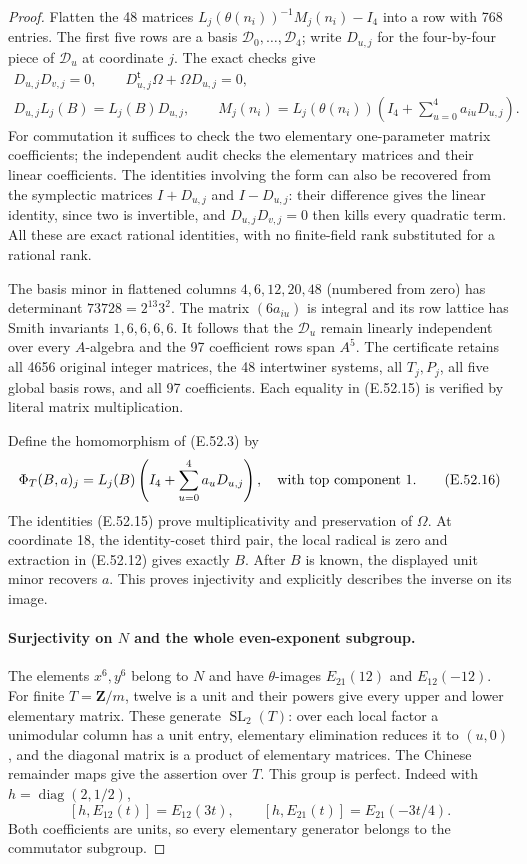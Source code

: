 \begin{proof}
Flatten the 48 matrices
$L_j(\theta(n_i))^{-1}M_j(n_i)-I_4$ into a row
with 768 entries. The first five rows are a basis
$\mathcal D_0,\ldots,\mathcal D_4$; write
$D_{u,j}$ for the four-by-four piece of $\mathcal D_u$
at coordinate $j$. The exact checks give
\[
 \begin{gathered}
 D_{u,j}D_{v,j}=0,
 \qquad D_{u,j}^{\mathsf t}\Omega+\Omega D_{u,j}=0,\\
 D_{u,j}L_j(B)=L_j(B)D_{u,j},\qquad
 M_j(n_i)=L_j(\theta(n_i))
                    \left(I_4+\sum_{u=0}^4a_{iu}D_{u,j}\right).
 \end{gathered}
 \tag{E.52.15}
\]
For commutation it suffices to check the two elementary
one-parameter matrix coefficients; the independent audit
checks the elementary matrices and their linear
coefficients. The identities involving the form can
also be recovered from the symplectic matrices
$I+D_{u,j}$ and $I-D_{u,j}$: their difference gives
the linear identity, since two is invertible, and
$D_{u,j}D_{v,j}=0$ then kills every quadratic term.
All these are exact rational identities, with no
finite-field rank substituted for a rational rank.

The basis minor in flattened columns
$4,6,12,20,48$ (numbered from zero) has determinant
$73728=2^{13}3^2$.
The matrix $(6a_{iu})$ is integral and its row lattice
has Smith invariants $1,6,6,6,6$.
It follows that the $\mathcal D_u$ remain linearly
independent over every $A$-algebra and the 97
coefficient rows span $A^5$.
The certificate retains all 4656 original integer
matrices, the 48 intertwiner systems, all $T_j,P_j$,
all five global basis rows, and all 97 coefficients.
Each equality in \textup{(E.52.15)} is verified by
literal matrix multiplication.

Define the homomorphism of \textup{(E.52.3)} by
\[
 \Phi_T(B,a)_j
       =L_j(B)\left(I_4+\sum_{u=0}^4a_uD_{u,j}\right),
                  \quad\hbox{with top component }1.
 \tag{E.52.16}
\]
The identities \textup{(E.52.15)} prove multiplicativity
and preservation of $\Omega$.
At coordinate 18, the identity-coset third pair, the
local radical is zero and extraction in
\textup{(E.52.12)} gives exactly $B$.
After $B$ is known, the displayed unit minor recovers
$a$. This proves injectivity and explicitly describes
the inverse on its image.

\paragraph{Surjectivity on $N$ and the whole even-exponent subgroup.}
The elements $x^6,y^6$ belong to $N$ and have
$\theta$-images $E_{21}(12)$ and $E_{12}(-12)$.
For finite $T=\mathbf Z/m$, twelve is a unit and
their powers give every upper and lower elementary
matrix. These generate $\operatorname{SL}_2(T)$:
over each local factor a unimodular column has a
unit entry, elementary elimination reduces it to
$(u,0)$, and the diagonal matrix is a product of
elementary matrices. The Chinese remainder maps
give the assertion over $T$.
This group is perfect. Indeed with
$h=\operatorname{diag}(2,1/2)$,
\[
 [h,E_{12}(t)]=E_{12}(3t),\qquad
 [h,E_{21}(t)]=E_{21}(-3t/4).
 \tag{E.52.17}
\]
Both coefficients are units, so every elementary
generator belongs to the commutator subgroup.


\end{proof}
